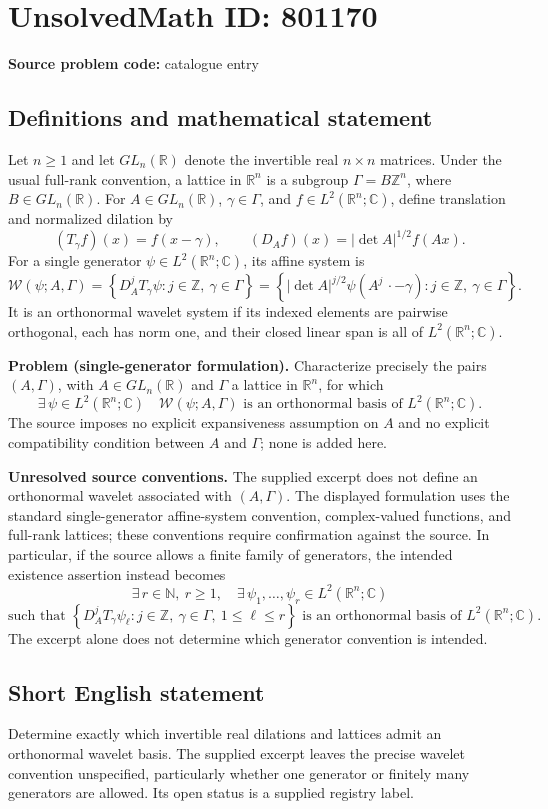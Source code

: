 \documentclass[11pt]{article}
\newcommand{\N}{\mathbb{N}}
\newcommand{\Z}{\mathbb{Z}}
\newcommand{\R}{\mathbb{R}}
\newcommand{\C}{\mathbb{C}}
\begin{document}
\section*{UnsolvedMath ID: 801170}
\textbf{Source problem code:} catalogue entry
\subsection{Definitions and mathematical statement}
Let \(n\geq 1\) and let \(GL_n(\R)\) denote the invertible real \(n\times n\) matrices. Under the usual full-rank convention, a lattice in \(\R^n\) is a subgroup \(\Gamma=B\Z^n\), where \(B\in GL_n(\R)\). For \(A\in GL_n(\R)\), \(\gamma\in\Gamma\), and \(f\in L^2(\R^n;\C)\), define translation and normalized dilation by
\[
(T_\gamma f)(x)=f(x-\gamma),\qquad (D_Af)(x)=|\det A|^{1/2}f(Ax).
\]
For a single generator \(\psi\in L^2(\R^n;\C)\), its affine system is
\[
\mathcal W(\psi;A,\Gamma)
=\left\{D_A^jT_\gamma\psi:j\in\Z,\ \gamma\in\Gamma\right\}
=\left\{|\det A|^{j/2}\psi(A^j\,\cdot-\gamma):j\in\Z,\ \gamma\in\Gamma\right\}.
\]
It is an orthonormal wavelet system if its indexed elements are pairwise orthogonal, each has norm one, and their closed linear span is all of \(L^2(\R^n;\C)\).

\textbf{Problem (single-generator formulation).} Characterize precisely the pairs \((A,\Gamma)\), with \(A\in GL_n(\R)\) and \(\Gamma\) a lattice in \(\R^n\), for which
\[
\exists\,\psi\in L^2(\R^n;\C)\quad
\mathcal W(\psi;A,\Gamma)\text{ is an orthonormal basis of }L^2(\R^n;\C).
\]
The source imposes no explicit expansiveness assumption on \(A\) and no explicit compatibility condition between \(A\) and \(\Gamma\); none is added here.

\textbf{Unresolved source conventions.} The supplied excerpt does not define an orthonormal wavelet associated with \((A,\Gamma)\). The displayed formulation uses the standard single-generator affine-system convention, complex-valued functions, and full-rank lattices; these conventions require confirmation against the source. In particular, if the source allows a finite family of generators, the intended existence assertion instead becomes
\[
\exists\,r\in\N,\ r\geq1,\quad
\exists\,\psi_1,\ldots,\psi_r\in L^2(\R^n;\C)
\]
\[
\text{such that }\left\{D_A^jT_\gamma\psi_\ell:
 j\in\Z,\ \gamma\in\Gamma,\ 1\leq\ell\leq r\right\}
\text{ is an orthonormal basis of }L^2(\R^n;\C).
\]
The excerpt alone does not determine which generator convention is intended.
\subsection{Short English statement}
Determine exactly which invertible real dilations and lattices admit an orthonormal wavelet basis. The supplied excerpt leaves the precise wavelet convention unspecified, particularly whether one generator or finitely many generators are allowed. Its open status is a supplied registry label.
\end{document}
